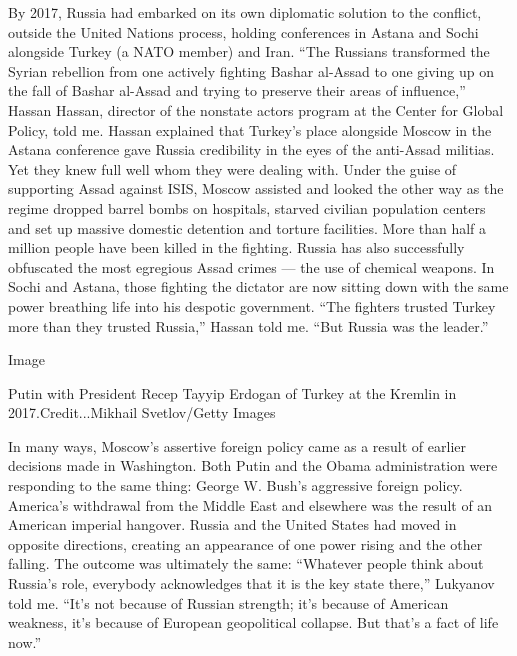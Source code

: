 By 2017, Russia had embarked on its own diplomatic solution to the
conflict, outside the United Nations process, holding conferences in
Astana and Sochi alongside Turkey (a NATO member) and Iran. ``The
Russians transformed the Syrian rebellion from one actively fighting
Bashar al-Assad to one giving up on the fall of Bashar al-Assad and
trying to preserve their areas of influence,'' Hassan Hassan, director
of the nonstate actors program at the Center for Global Policy, told me.
Hassan explained that Turkey's place alongside Moscow in the Astana
conference gave Russia credibility in the eyes of the anti-Assad
militias. Yet they knew full well whom they were dealing with. Under the
guise of supporting Assad against ISIS, Moscow assisted and looked the
other way as the regime dropped barrel bombs on hospitals, starved
civilian population centers and set up massive domestic detention and
torture facilities. More than half a million people have been killed in
the fighting. Russia has also successfully obfuscated the most egregious
Assad crimes --- the use of chemical weapons. In Sochi and Astana, those
fighting the dictator are now sitting down with the same power breathing
life into his despotic government. ``The fighters trusted Turkey more
than they trusted Russia,'' Hassan told me. ``But Russia was the
leader.''

Image

Putin with President Recep Tayyip Erdogan of Turkey at the Kremlin in
2017.Credit...Mikhail Svetlov/Getty Images

In many ways, Moscow's assertive foreign policy came as a result of
earlier decisions made in Washington. Both Putin and the Obama
administration were responding to the same thing: George W. Bush's
aggressive foreign policy. America's withdrawal from the Middle East and
elsewhere was the result of an American imperial hangover. Russia and
the United States had moved in opposite directions, creating an
appearance of one power rising and the other falling. The outcome was
ultimately the same: ``Whatever people think about Russia's role,
everybody acknowledges that it is the key state there,'' Lukyanov told
me. ``It's not because of Russian strength; it's because of American
weakness, it's because of European geopolitical collapse. But that's a
fact of life now.''

